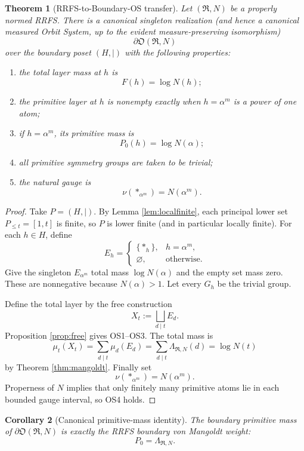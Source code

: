 \documentclass[11pt]{article}
\newtheorem{theorem}{Theorem}[section]
\newtheorem{corollary}[theorem]{Corollary}
\newcommand{\cR}{\mathfrak R}
\newcommand{\cO}{\mathfrak O}
\begin{document}
\begin{theorem}[RRFS-to-Boundary-OS transfer]\label{thm:transfer}
Let $(\cR,N)$ be a properly normed RRFS. There is a canonical singleton realization (and hence a canonical measured Orbit System, up to the evident measure-preserving isomorphism)
\[
\partial\cO(\cR,N)
\]
over the boundary poset $(H,\mid)$ with the following properties:
\begin{enumerate}[label=(\roman*)]
\item the total layer mass at $h$ is
\[
F(h)=\log N(h);
\]
\item the primitive layer at $h$ is nonempty exactly when $h=\alpha^m$ is a power of one atom;
\item if $h=\alpha^m$, its primitive mass is
\[
P_0(h)=\log N(\alpha);
\]
\item all primitive symmetry groups are taken to be trivial;
\item the natural gauge is
\[
\nu(\ast_{\alpha^m})=N(\alpha^m).
\]
\end{enumerate}
\end{theorem}

\begin{proof}
Take $P=(H,\mid)$. By Lemma \ref{lem:localfinite}, each principal lower set $P_{\le t}=[1,t]$ is finite, so $P$ is lower finite (and in particular locally finite). For each $h\in H$, define
\[
E_h=
\begin{cases}
\{\ast_h\},&h=\alpha^m,\\
\varnothing,&\text{otherwise}.
\end{cases}
\]
Give the singleton $E_{\alpha^m}$ total mass $\log N(\alpha)$ and the empty set mass zero. These are nonnegative because $N(\alpha)>1$. Let every $G_h$ be the trivial group.

Define the total layer by the free construction
\[
X_t:=\bigsqcup_{d\mid t}E_d.
\]
Proposition \ref{prop:free} gives OS1--OS3. The total mass is
\[
\mu_t(X_t)
=\sum_{d\mid t}\mu_d(E_d)
=\sum_{d\mid t}\Lambda_{\cR,N}(d)
=\log N(t)
\]
by Theorem \ref{thm:mangoldt}. Finally set
\[
\nu(\ast_{\alpha^m})=N(\alpha^m).
\]
Properness of $N$ implies that only finitely many primitive atoms lie in each bounded gauge interval, so OS4 holds.
\end{proof}

\begin{corollary}[Canonical primitive-mass identity]\label{cor:canonical}
The boundary primitive mass of $\partial\cO(\cR,N)$ is exactly the RRFS boundary von Mangoldt weight:
\[
\boxed{P_0=\Lambda_{\cR,N}.}
\]
\end{corollary}
\end{document}
